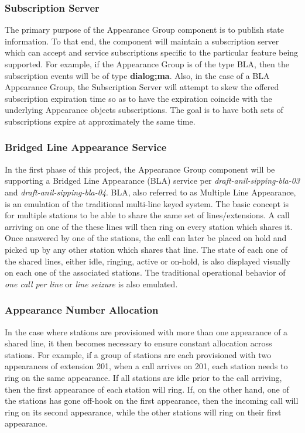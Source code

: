 \documentclass[twoside,11pt]{article}
\newcommand{\bold}[1]{\textbf{#1}}
\begin{document}
\subsubsection{Subscription Server}
The primary purpose of the Appearance Group component is to publish state information.  To that end,
the component will maintain a subscription server which can accept and service subscriptions
specific to the particular feature being supported.  For example, if the Appearance Group is of the
type BLA, then the subscription events will be of type \bold{dialog;ma}.  Also, in the case of a BLA
Appearance Group, the Subscription Server will attempt to skew the offered subscription expiration
time so as to have the expiration coincide with the underlying Appearance objects subscriptions. 
The goal is to have both sets of subscriptions expire at approximately the same time.

\subsubsection{Bridged Line Appearance Service}
In the first phase of this project, the Appearance Group component will be supporting a Bridged Line
Appearance (BLA) service per \emph{draft-anil-sipping-bla-03} and \emph{draft-anil-sipping-bla-04}. 
BLA, also referred to as Multiple Line Appearance, is an emulation of the traditional multi-line
keyed system.  The basic concept is for multiple stations to be able to share the same set of
lines/extensions.  A call arriving on one of the these lines will then ring on every station which
shares it. Once answered by one of the stations, the call can later be placed on hold and picked up
by any other station which shares that line.  The state of each one of the shared lines, either
idle, ringing, active or on-hold, is also displayed visually on each one of the associated stations.
 The traditional operational behavior of \emph{one call per line} or \emph{line seizure} is also
emulated.

\subsubsection{Appearance Number Allocation}
In the case where stations are provisioned with more than one appearance of a shared line, it then
becomes necessary to ensure constant allocation across stations.  For example, if a group of
stations are each provisioned with two appearances of extension 201, when a call arrives on 201,
each station needs to ring on the same appearance. If all stations are idle prior to the call
arriving, then the first appearance of each station will ring.  If, on the other hand, one of the
stations has gone off-hook on the first appearance, then the incoming call will ring on its second
appearance, while the other stations will ring on their first appearance.
\end{document}
